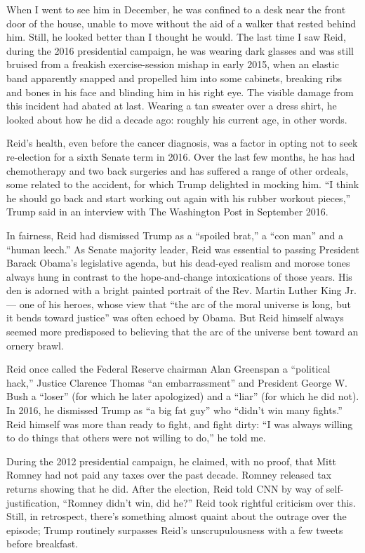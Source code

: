 When I went to see him in December, he was confined to a desk near the
front door of the house, unable to move without the aid of a walker that
rested behind him. Still, he looked better than I thought he would. The
last time I saw Reid, during the 2016 presidential campaign, he was
wearing dark glasses and was still bruised from a freakish
exercise-session mishap in early 2015, when an elastic band apparently
snapped and propelled him into some cabinets, breaking ribs and bones in
his face and blinding him in his right eye. The visible damage from this
incident had abated at last. Wearing a tan sweater over a dress shirt,
he looked about how he did a decade ago: roughly his current age, in
other words.

Reid's health, even before the cancer diagnosis, was a factor in opting
not to seek re-election for a sixth Senate term in 2016. Over the last
few months, he has had chemotherapy and two back surgeries and has
suffered a range of other ordeals, some related to the accident, for
which Trump delighted in mocking him. ``I think he should go back and
start working out again with his rubber workout pieces,'' Trump said in
an interview with The Washington Post in September 2016.

In fairness, Reid had dismissed Trump as a ``spoiled brat,'' a ``con
man'' and a ``human leech.'' As Senate majority leader, Reid was
essential to passing President Barack Obama's legislative agenda, but
his dead-eyed realism and morose tones always hung in contrast to the
hope-and-change intoxications of those years. His den is adorned with a
bright painted portrait of the Rev. Martin Luther King Jr. --- one of
his heroes, whose view that ``the arc of the moral universe is long, but
it bends toward justice'' was often echoed by Obama. But Reid himself
always seemed more predisposed to believing that the arc of the universe
bent toward an ornery brawl.

Reid once called the Federal Reserve chairman Alan Greenspan a
``political hack,'' Justice Clarence Thomas ``an embarrassment'' and
President George W. Bush a ``loser'' (for which he later apologized) and
a ``liar'' (for which he did not). In 2016, he dismissed Trump as ``a
big fat guy'' who ``didn't win many fights.'' Reid himself was more than
ready to fight, and fight dirty: ``I was always willing to do things
that others were not willing to do,'' he told me.

During the 2012 presidential campaign, he claimed, with no proof, that
Mitt Romney had not paid any taxes over the past decade. Romney released
tax returns showing that he did. After the election, Reid told CNN by
way of self-justification, ``Romney didn't win, did he?'' Reid took
rightful criticism over this. Still, in retrospect, there's something
almost quaint about the outrage over the episode; Trump routinely
surpasses Reid's unscrupulousness with a few tweets before breakfast.

